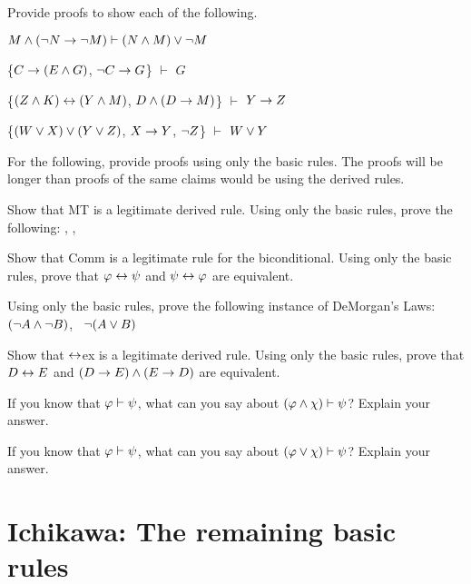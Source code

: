 \solutions
\problempart
\label{pr.solvedPLproofs2}
Provide proofs to show each of the following.
\begin{earg}
\item $M \wedge (\neg N \rightarrow \neg M) \vdash (N \wedge M) \vee \neg M$
\item \{$C\rightarrow(E\wedge G)$, $\neg C \rightarrow G$\} $\vdash$ $G$
\item \{$(Z\wedge K)\leftrightarrow(Y\wedge M)$, $D\wedge(D\rightarrow M)$\} $\vdash$ $Y\rightarrow Z$
\item \{$(W \vee X) \vee (Y \vee Z)$, $X\rightarrow Y$, $\neg Z$\} $\vdash$ $W\vee Y$
\end{earg}



\problempart
For the following, provide proofs using only the basic rules. The proofs will be longer than proofs of the same claims would be using the derived rules.
\begin{earg}
\item Show that MT is a legitimate derived rule. Using only the basic rules, prove the following: \metaA{}\eif\metaB{}, \enot\metaB{}, \therefore\ \enot\metaA{}
\item Show that Comm is a legitimate rule for the biconditional. Using only the basic rules, prove that $\varphi{}\leftrightarrow\psi{}$ and $\psi{}\leftrightarrow\varphi{}$ are equivalent.
\item Using only the basic rules, prove the following instance of DeMorgan's Laws: $(\neg A \wedge \neg B)$, \therefore\ $\neg(A \vee B)$
\item Show that $\leftrightarrow${ex} is a legitimate derived rule. Using only the basic rules, prove that $D\leftrightarrow E$ and $(D\rightarrow E)\wedge(E\rightarrow D)$ are equivalent.
\end{earg}




\problempart
\begin{earg}
\item If you know that $\varphi{}\vdash\psi{}$, what can you say about $(\varphi{}\wedge\chi{})\vdash\psi{}$? Explain your answer.
\item If you know that $\varphi{}\vdash\psi{}$, what can you say about $(\varphi{}\vee\chi{})\vdash\psi{}$? Explain your answer.
\end{earg}






\section{Ichikawa: The remaining basic rules}

